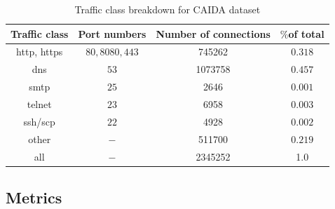 \begin{table}
\center \caption{Traffic class breakdown for CAIDA dataset}\label{tab:traffic_class}
\begin{tabular}{|c|c|c|c|}
\hline
 Traffic class& Port numbers &Number of connections&$\%$of total\\
      \hline
		http, https& $80, 8080, 443$&745262&$0.318$\\
		dns& $53$&1073758&$0.457$\\
		smtp& $25$&2646&$0.001$\\
		telnet&$23$&6958&$0.003$\\
		ssh/scp&$22$&4928&$0.002$\\
		other&$-$&511700&$0.219$\\
		all &$-$&2345252&1.0\\
\hline
\end{tabular}
\end{table}

\subsection{Metrics}

